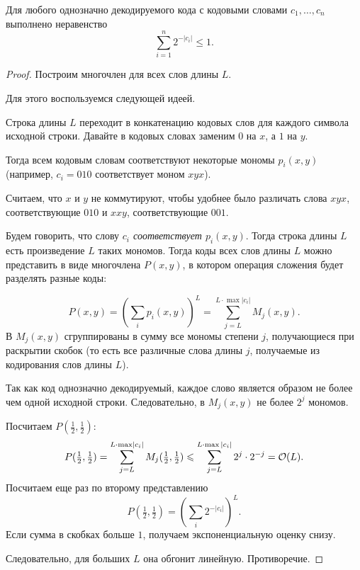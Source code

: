 \begin{thm}\label{thm:km}
    Для любого однозначно декодируемого кода с кодовыми словами $  c_1, \ldots , c_n$ выполнено неравенство
	\[
	\sum_{i=1}^{n} 2^{-\lvert c_i \rvert } \le 1
	.\] 
\end{thm}
\begin{proof}
	Построим многочлен для всех слов длины $ L$. 

	Для этого воспользуемся следующей идеей.

	Строка длины $L$ переходит в конкатенацию кодовых слов для каждого символа исходной строки.
	Давайте в кодовых словах заменим $0$ на $x$, а $1$ на $y$. 

	Тогда всем кодовым словам соответствуют некоторые мономы $ p_i(x, y)$ (например, $c_i = 010$ соответствует моном $xyx$).

	Считаем, что $x$ и $y$ не коммутируют, чтобы удобнее было различать слова $xyx$, соответствующие $010$ и $xxy$, соответствующие $001$. 

	Будем говорить, что слову \textit{$c_i$ соответствует $p_i(x,y)$}. 
	Тогда строка длины $L$ есть произведение $L$ таких мономов. Тогда коды всех слов длины $L$ можно представить в виде многочлена $P(x, y)$, в котором операция сложения будет разделять разные коды:

	\[
		P(x, y) = \left( \sum_{i}^{} p_i(x, y) \right) ^{L} = \sum_{j=L}^{L\cdot\max \lvert c_i\rvert} M_j(x, y)
	.\] 
	В $M_j(x, y)$ сгруппированы в сумму все мономы степени $j$, получающиеся при раскрытии скобок (то есть все различные слова длины $j$, получаемые из кодирования слов длины $L$).

	Так как код однозначно декодируемый, каждое слово является образом не более чем одной исходной строки. Следовательно, в $M_j(x, y)$ не более $2^j$ мономов.

	Посчитаем $ P(\frac{1}{2}, \frac{1}{2})$:
	\[
		P(\tfrac{1}{2},\tfrac{1}{2}) = \sum_{j=L}^{L\cdot\max \lvert c_i\rvert} M_{j}(\tfrac{1}{2},\tfrac{1}{2}) 
		\leqslant \sum_{j=L}^{L \cdot \max |c_i|}2^{j} \cdot 2 ^{-j} = \mathcal{O}(L)
	.\] 
	Посчитаем еще раз по второму представлению
	\[
		P(\tfrac{1}{2},\tfrac{1}{2}) = \left( \sum_{i} 2^{-\lvert c_i \rvert } \right) ^{L}
	.\] 
	Если сумма в скобках больше $ 1$, получаем экспоненциальную оценку снизу.

	Следовательно, для больших $ L$ она обгонит линейную. Противоречие.
\end{proof}

